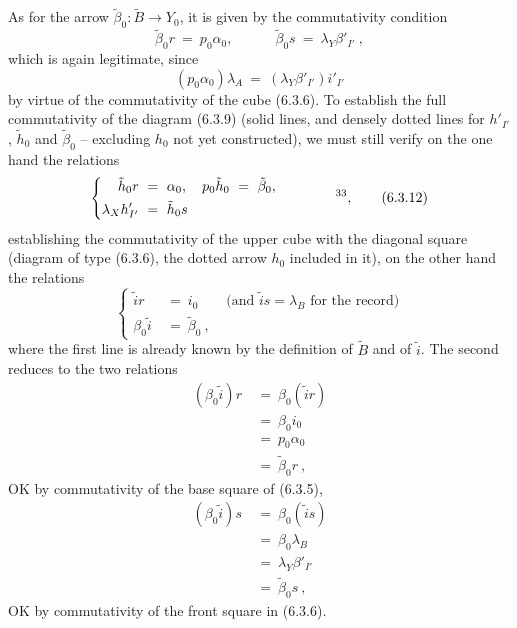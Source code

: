 \documentclass[11pt]{article}
\newcommand{\printedpage}[1]{\marginpar{\footnotesize p.~#1}}
\newcommand{\msp}[1]{\marginpar{\footnotesize [#1]}}
\begin{document}
\msp{page 114}As for the arrow $\tilde{\beta}_0 : \tilde{B} \longrightarrow Y_0$, it is given by the commutativity condition
\[
\tilde{\beta}_0r \ =\ p_0\alpha_0, \qquad\quad \tilde{\beta}_0s \ =\ \lambda_Y\beta'_{I'}\ ,
\tag*{(6.3.11)}
\]
which is again legitimate, since
\[
(p_0\alpha_0)\lambda_A \ =\ (\lambda_Y\beta'_{I'})i'_{I'}
\]
by virtue of the commutativity of the cube (6.3.6). To establish the full commutativity of the diagram (6.3.9) (solid lines, and densely dotted lines for $h'_{I'}$, $\tilde{h}_0$ and $\tilde{\beta}_0$ -- excluding $h_0$ not yet constructed), we must still verify on the one hand the relations %
\[
\left\{
\begin{aligned}
\tilde{h}_0r \ &=\ \alpha_0, \quad p_0\tilde{h}_0 \ =\ \tilde{\beta}_0, \\
\lambda_X h'_{I'} \ &=\ \tilde{h}_0s
\end{aligned}
\right.
\qquad\qquad \text{\footnotemark[33]},
\tag*{(6.3.12)}
\]
establishing the commutativity of the upper cube with the diagonal square (diagram of type (6.3.6), the dotted arrow $h_0$ included in it), on the other hand the relations
\[
\left\{
\begin{aligned}
\tilde{i}r \ &=\ i_0 \qquad \text{(and $\tilde{i}s = \lambda_B$ for the record)} \\
\beta_0\tilde{i} \ &=\ \tilde{\beta}_0\ ,
\end{aligned}
\right.
\tag*{(6.3.13)}
\]
where the first line is already known by the definition of $\tilde{B}$ and of $\tilde{i}$. The second
\msp{page 115}reduces to the two relations
\[
\begin{aligned}
(\beta_0\tilde{i})r \ &=\ \beta_0(\tilde{i}r) \\
&=\ \beta_0i_0 \\
&=\ p_0\alpha_0 \\
&=\ \tilde{\beta}_0r\ ,
\end{aligned}
\]
OK by commutativity of the base square of (6.3.5),
\[
\begin{aligned}
(\beta_0\tilde{i})s \ &=\ \beta_0(\tilde{i}s) \\
&=\ \beta_0\lambda_B \\
&=\ \lambda_Y\beta'_{I'} \\
&=\ \tilde{\beta}_0s\ ,
\end{aligned}
\]
\printedpage{58}
OK by commutativity of the front square in (6.3.6).
\end{document}
